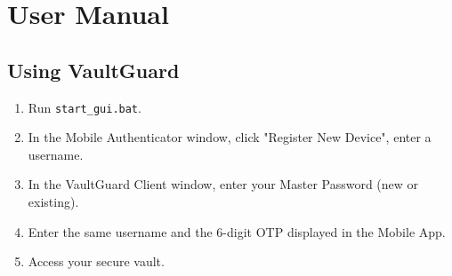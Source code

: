 \documentclass[12pt,a4paper]{report}
\begin{document}
\chapter{User Manual}

\section{Using VaultGuard}
\begin{enumerate}
    \item Run \texttt{start\_gui.bat}.
    \item In the Mobile Authenticator window, click "Register New Device", enter a username.
    \item In the VaultGuard Client window, enter your Master Password (new or existing).
    \item Enter the same username and the 6-digit OTP displayed in the Mobile App.
    \item Access your secure vault.
\end{enumerate}
\end{document}
